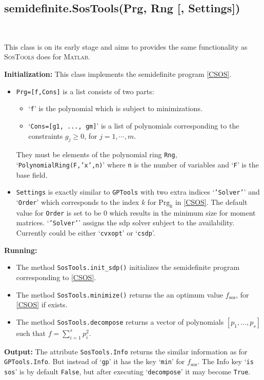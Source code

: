 \documentclass{amsart}
\theoremstyle{definition}
\newcommand{\rsos}[1]{#1_{\textrm{sos}}}
\begin{document}
\subsection{semidefinite.SosTools(Prg, Rng [, Settings])}~

This class is on its early stage and aims to provides the same functionality as \textsc{SosTools} does for \textsc{Matlab}.

\noindent\textbf{Initialization:}
This class implements the semidefinite program \eqref{CSOS}.
\begin{itemize}
	\item{\texttt{Prg=[f,Cons]} is a list consists of two parts:
	\begin{itemize}
		\item{`\texttt{f}' is the polynomial which is subject to minimizations.}
		\item{`\texttt{Cons=[g1, ..., gm]}' is a list of polynomials corresponding to the constraints $g_j\ge0$, for $j=1,\cdots,m$.}
	\end{itemize}
	They must be elements of the polynomial ring \texttt{Rng}, `\texttt{PolynomialRing(F,'x',n)}' where \texttt{n} is 
	the number of variables and `\texttt{F}' is the base field.}
	\item{\texttt{Settings} is exactly similar to \texttt{GPTools} with two extra indices `\texttt{'Solver'}' and `\texttt{Order}' which corresponds to the index $k$ for $\textrm{Prg}_k$
	in \eqref{CSOS}.
	The default value for \texttt{Order} is set to be 0 which results in the minimum size for moment matrices.
    `\texttt{'Solver'}' assigns the sdp solver subject to the availability. Currently could be either `\texttt{cvxopt}' or `\texttt{csdp}'.}
\end{itemize}

\noindent\textbf{Running:}
\begin{itemize}
	\item{The method \texttt{SosTools.init\_sdp()} initializes the semidefinite program corresponding to \eqref{CSOS}.}
	\item{The method \texttt{SosTools.minimize()} returns the an optimum value $\rsos{f}$, for \eqref{CSOS} if exists.}
	\item{The method \texttt{SosTools.decompose} returns a vector of polynomials $[p_1,\dots,p_s]$ such that $f=\sum_{i=1}^s p_i^2$.}
\end{itemize}

\noindent\textbf{Output:}
The attribute \texttt{SosTools.Info} returns the similar information as for \texttt{GPTools.Info}. But instead of `\texttt{gp}' it has the key `\texttt{min}'
for $\rsos{f}$. The Info key `\texttt{is sos}' is by default \texttt{False}, but after executing `\texttt{decompose}' it may become \texttt{True}.
\end{document}
